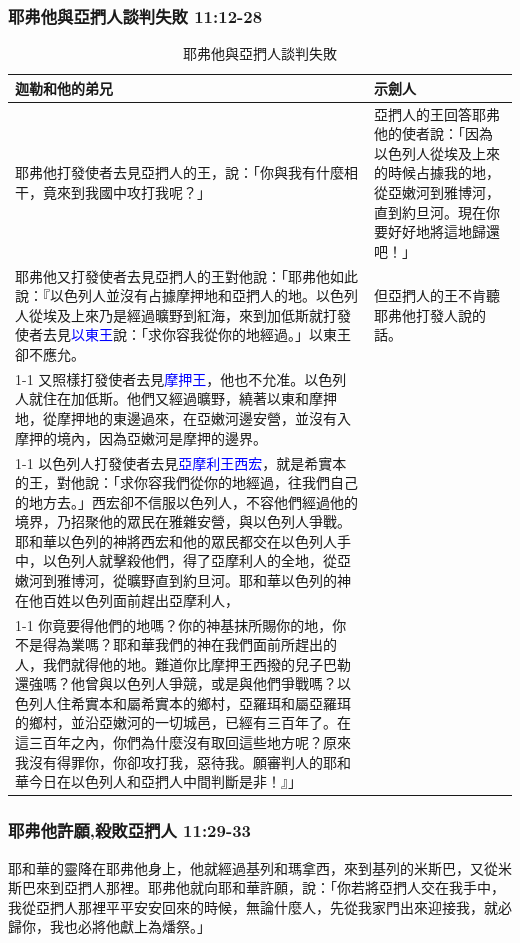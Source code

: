 \subsubsection{耶弗他與亞捫人談判失敗 11:12-28}  
\begin{table}[H]
\centering
\begin{tabular}{p{12.3cm}|p{4.7cm}}\hline\hline
迦勒和他的弟兄&示劍人\\\hline
耶弗他打發使者去見亞捫人的王，說：「你與我有什麼相干，竟來到我國中攻打我呢？」
&亞捫人的王回答耶弗他的使者說：「因為以色列人從埃及上來的時候占據我的地，從亞嫩河到雅博河，直到約旦河。現在你要好好地將這地歸還吧！」\\\hline
耶弗他又打發使者去見亞捫人的王對他說：「耶弗他如此說：『以色列人並沒有占據摩押地和亞捫人的地。以色列人從埃及上來乃是經過曠野到紅海，來到加低斯就打發使者去見\textcolor{blue}{以東王}說：「求你容我從你的地經過。」以東王卻不應允。
&但亞捫人的王不肯聽耶弗他打發人說的話。\\\cline{1-1}
又照樣打發使者去見\textcolor{blue}{摩押王}，他也不允准。以色列人就住在加低斯。他們又經過曠野，繞著以東和摩押地，從摩押地的東邊過來，在亞嫩河邊安營，並沒有入摩押的境內，因為亞嫩河是摩押的邊界。&\\\cline{1-1}
以色列人打發使者去見\textcolor{blue}{亞摩利王西宏}，就是希實本的王，對他說：「求你容我們從你的地經過，往我們自己的地方去。」西宏卻不信服以色列人，不容他們經過他的境界，乃招聚他的眾民在雅雜安營，與以色列人爭戰。耶和華以色列的神將西宏和他的眾民都交在以色列人手中，以色列人就擊殺他們，得了亞摩利人的全地，從亞嫩河到雅博河，從曠野直到約旦河。耶和華以色列的神在他百姓以色列面前趕出亞摩利人，&\\\cline{1-1}
你竟要得他們的地嗎？你的神基抹所賜你的地，你不是得為業嗎？耶和華我們的神在我們面前所趕出的人，我們就得他的地。難道你比摩押王西撥的兒子巴勒還強嗎？他曾與以色列人爭競，或是與他們爭戰嗎？以色列人住希實本和屬希實本的鄉村，亞羅珥和屬亞羅珥的鄉村，並沿亞嫩河的一切城邑，已經有三百年了。在這三百年之內，你們為什麼沒有取回這些地方呢？原來我沒有得罪你，你卻攻打我，惡待我。願審判人的耶和華今日在以色列人和亞捫人中間判斷是非！』」&\\\hline
 \end{tabular}
\caption{耶弗他與亞捫人談判失敗}
\end{table}  


\subsubsection{耶弗他許願,殺敗亞捫人 11:29-33}  
耶和華的靈降在耶弗他身上，他就經過基列和瑪拿西，來到基列的米斯巴，又從米斯巴來到亞捫人那裡。耶弗他就向耶和華許願，說：「你若將亞捫人交在我手中，我從亞捫人那裡平平安安回來的時候，無論什麼人，先從我家門出來迎接我，就必歸你，我也必將他獻上為燔祭。」

